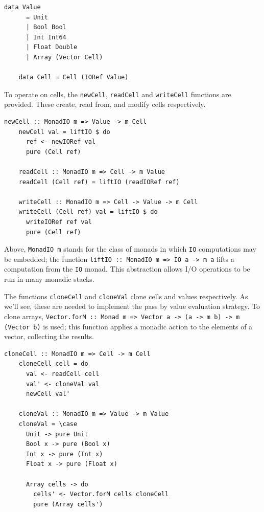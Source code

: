 \documentclass[UdineBachThesis,american,11pt]{PhdThesis}
\begin{document}
  \begin{Verbatim}[gobble=4,fontsize=\small]
    data Value
      = Unit
      | Bool Bool
      | Int Int64
      | Float Double
      | Array (Vector Cell)

    data Cell = Cell (IORef Value)
  \end{Verbatim}

  To operate on cells, the \mbox{\texttt{newCell}}, \mbox{\texttt{readCell}} and
  \mbox{\texttt{writeCell}} functions are provided. These create, read from, and
  modify cells respectively.

  \begin{Verbatim}[gobble=4,fontsize=\small]
    newCell :: MonadIO m => Value -> m Cell
    newCell val = liftIO $ do
      ref <- newIORef val
      pure (Cell ref)

    readCell :: MonadIO m => Cell -> m Value
    readCell (Cell ref) = liftIO (readIORef ref)

    writeCell :: MonadIO m => Cell -> Value -> m Cell
    writeCell (Cell ref) val = liftIO $ do
      writeIORef ref val
      pure (Cell ref)
  \end{Verbatim}

  Above, \mbox{\texttt{MonadIO m}} stands for the class of monads in which
  \mbox{\texttt{IO}} computations may be embedded; the function
  \mbox{\texttt{liftIO :: MonadIO m => IO a -> m a}} lifts a computation from
  the \mbox{\texttt{IO}} monad. This abstraction allows I/O operations to be run
  in many monadic stacks.

  The functions \mbox{\texttt{cloneCell}} and \mbox{\texttt{cloneVal}} clone
  cells and values respectively. As we'll see, these are needed to implement the
  pass by value evaluation strategy. To clone arrays,
  \mbox{\texttt{Vector.forM :: Monad m => Vector a -> (a -> m b) -> m (Vector b)}}
  is used; this function applies a monadic action to the elements of a vector,
  collecting the results.

  \begin{Verbatim}[gobble=4,fontsize=\small]
    cloneCell :: MonadIO m => Cell -> m Cell
    cloneCell cell = do
      val <- readCell cell
      val' <- cloneVal val
      newCell val'

    cloneVal :: MonadIO m => Value -> m Value
    cloneVal = \case
      Unit -> pure Unit
      Bool x -> pure (Bool x)
      Int x -> pure (Int x)
      Float x -> pure (Float x)

      Array cells -> do
        cells' <- Vector.forM cells cloneCell
        pure (Array cells')
  \end{Verbatim}
\end{document}
